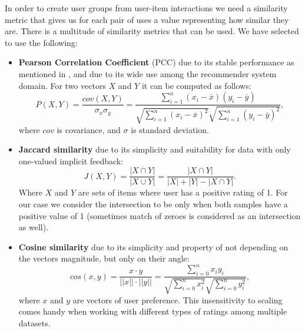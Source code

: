 In order to create user groups from user-item interactions we need a similarity metric that gives us for each pair of uses a value representing how similar they are. There is a multitude of similarity metrics that can be used. We have selected to use the following: 
\begin{itemize}
    \item 
        \textbf{Pearson Correlation Coefficient} (PCC) due to its stable performance as mentioned in \cite{similarity_measures_comparason},  and due to its wide use among the recommender system domain.
        For two vectors $X$ and $Y$ it can be computed as follows:
        \begin{equation}
            P(X,Y) = \frac{cov(X,Y)}{\sigma_x \sigma_y}
            = \frac{\sum\limits_{i=1}^{n} (x_i - \overline{x})(y_i - \overline{y})}{\sqrt{\sum\limits_{i=1}^{n} (x_i - \overline{x})^2}\sqrt{\sum\limits_{i=1}^{n}(y_i - \overline{y})^2}},
        \end{equation}
        where $cov$ is covariance, and $\sigma$ is standard deviation.
        
        
    \item
        \textbf{Jaccard similarity} due to its simplicity and suitability for data with only one-valued implicit feedback:
        \begin{equation}
            J(X,Y) = \frac{|X \cap Y|}{|X \cup Y|} = \frac{|X \cap Y|}{|X| + |Y| - |X \cap Y|}.
        \end{equation}
        Where $X$ and $Y$ are sets of items where user has a positive rating of 1.
        For our case we consider the intersection to be only when both samples have a positive value of 1 (sometimes match of zeroes is considered as an intersection as well).
        
    \item
        \textbf{Cosine similarity} due to its simplicity and property of not depending on the vectors magnitude, but only on their angle:
        \begin{equation}
            cos(x, y) = \frac {x \cdot y}{||x|| \cdot ||y||}
             = \frac{\sum\limits_{i=0}^{n}{x_i y_i}} {\sqrt{\sum\limits_{i=0}^{n}{x_i^2}}\sqrt{\sum\limits_{i=0}^{n}{y_i^2}}}
            ,
        \end{equation}
        where $x$ and $y$ are vectors of user preference.
        This insensitivity to scaling comes handy when working with different types of ratings among multiple datasets. 
\end{itemize}

